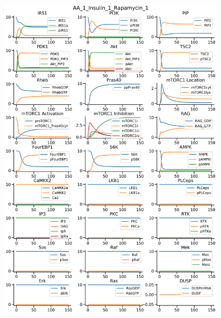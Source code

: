 \documentclass{beamer}
\begin{document}
\begin{frame}
\begin{figure}
\begin{minipage}{0.45\textwidth}
        \centering
        \includegraphics[width=\textwidth]{../simulations/ExtendedPI3KModel/validations/AAWithInsulinWithRapamycin/AA_1_Insulin_1_Rapamycin_1-7.png}
    \end{minipage}
\end{figure}
\end{frame}

\end{document}

